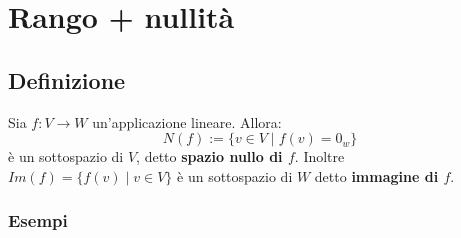 \documentclass[a4paper]{article}
\theoremstyle{break}
\theoremstyle{break}
\theoremstyle{break}
\theoremstyle{break}
\begin{document}
\section{Rango + nullità}
\subsection{Definizione}
Sia \( f: V \to W \) un'applicazione lineare. Allora:
\[
N(f) := \{v \in V \;|\; f(v) = 0_w\} 
\] 
è un sottospazio di \( V \), detto \textbf{spazio nullo di \( f \)}. Inoltre \( Im(f) =
\{f(v) \;|\; v \in V\} \) è un sottospazio di \( W \) detto \textbf{immagine di \( f \)}.

\subsubsection{Esempi}
\end{document}
